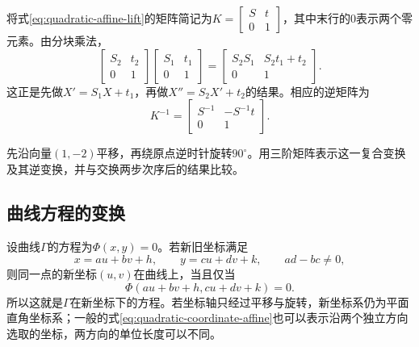 将式\eqref{eq:quadratic-affine-lift}的矩阵简记为\(K=\left[\begin{smallmatrix}S&t\\0&1\end{smallmatrix}\right]\)，其中末行的\(0\)表示两个零元素。由分块乘法，
\begin{equation}\label{eq:quadratic-affine-composition}
    \left[\begin{matrix}S_2&t_2\\0&1\end{matrix}\right]
    \left[\begin{matrix}S_1&t_1\\0&1\end{matrix}\right]
    =\left[\begin{matrix}S_2S_1&S_2t_1+t_2\\0&1\end{matrix}\right] .
\end{equation}
这正是先做\(X'=S_1X+t_1\)，再做\(X''=S_2X'+t_2\)的结果。相应的逆矩阵为
\begin{equation*}
    K^{-1}=\left[\begin{matrix}S^{-1}&-S^{-1}t\\0&1\end{matrix}\right] .
\end{equation*}

\begin{example}
先沿向量\((1,-2)\)平移，再绕原点逆时针旋转\(90^\circ\)。用三阶矩阵表示这一复合变换及其逆变换，并与交换两步次序后的结果比较。
\end{example}



\subsection{曲线方程的变换}
\label{subsec:quadratic-equation-transformation}

设曲线\(\Gamma\)的方程为\(\Phi(x,y)=0\)。若新旧坐标满足
\begin{equation}\label{eq:quadratic-coordinate-affine}
    x=au+bv+h , \qquad y=cu+dv+k , \qquad ad-bc\ne0 ,
\end{equation}
则同一点的新坐标\((u,v)\)在曲线上，当且仅当
\begin{equation}\label{eq:quadratic-substitution}
    \Phi(au+bv+h,cu+dv+k)=0 .
\end{equation}
所以这就是\(\Gamma\)在新坐标下的方程。若坐标轴只经过平移与旋转，新坐标系仍为平面直角坐标系；一般的式\eqref{eq:quadratic-coordinate-affine}也可以表示沿两个独立方向选取的坐标，两方向的单位长度可以不同。

